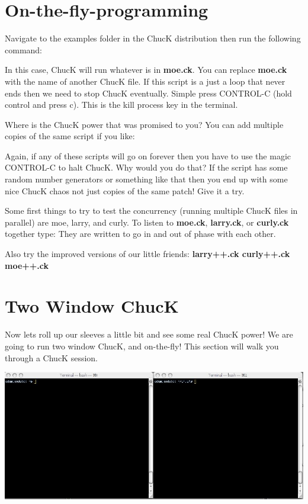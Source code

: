 \section{On-the-fly-programming}

Navigate to the examples folder in the ChucK distribution then run the following command:


In this case, ChucK will run whatever is in {\bf moe.ck}. You can replace {\bf moe.ck} with the name of another ChucK file. If this script is a just a loop that never ends then we need to stop ChucK eventually. Simple press CONTROL-C (hold control and press c). This is the kill process key in the terminal. 

Where is the ChucK power that was promised to you? You can add multiple copies of the same script if you like: 


Again, if any of these scripts will go on forever then you have to use the magic CONTROL-C to halt ChucK. Why would you do that? If the script has some random number generators or something like that then you end up with some nice ChucK chaos not just copies of the same patch! Give it a try. 

Some first things to try to test the concurrency (running multiple ChucK files in parallel) are moe, larry, and curly. To listen to {\bf moe.ck}, {\bf larry.ck}, or {\bf curly.ck} together type: They are written to go in and out of phase with each other. 

Also try the improved versions of our little friends: {\bf larry++.ck curly++.ck moe++.ck} 

\section*{Two Window ChucK}
Now lets roll up our sleeves a little bit and see some real ChucK power! We are going to run two window ChucK, and on-the-fly! This section will walk you through a ChucK session. 

\includegraphics[width=\textwidth]{images/2term}

